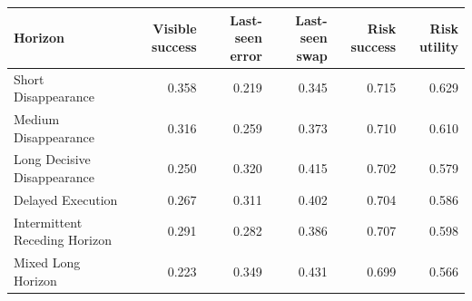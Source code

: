 \begin{tabular}{lrrrrr}
\toprule
Horizon & Visible success & Last-seen error & Last-seen swap & Risk success & Risk utility \\
\midrule
Short Disappearance & 0.358 & 0.219 & 0.345 & 0.715 & 0.629 \\
Medium Disappearance & 0.316 & 0.259 & 0.373 & 0.710 & 0.610 \\
Long Decisive Disappearance & 0.250 & 0.320 & 0.415 & 0.702 & 0.579 \\
Delayed Execution & 0.267 & 0.311 & 0.402 & 0.704 & 0.586 \\
Intermittent Receding Horizon & 0.291 & 0.282 & 0.386 & 0.707 & 0.598 \\
Mixed Long Horizon & 0.223 & 0.349 & 0.431 & 0.699 & 0.566 \\
\bottomrule
\end{tabular}

